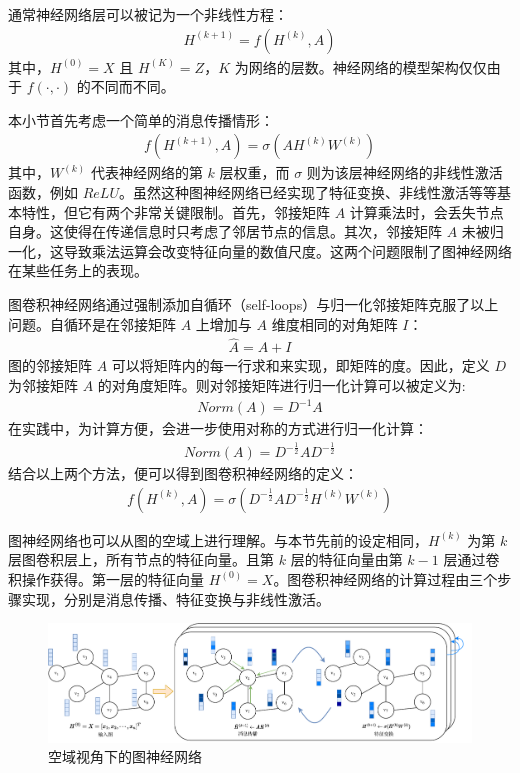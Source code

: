 通常神经网络层可以被记为一个非线性方程：
\begin{gather}
    H^{(k+1)} = f(H^{(k)}, A)
\end{gather}
其中，$H^{(0)} = X$ 且 $H^{(K)} = Z$，$K$ 为网络的层数。神经网络的模型架构仅仅由于 $f(\cdot, \cdot)$ 的不同而不同。

本小节首先考虑一个简单的消息传播情形：
\begin{gather}
    f(H^{(k+1)}, A) = \sigma (AH^{(k)}W^{(k)})
\end{gather}
其中，$W^{(k)}$ 代表神经网络的第 $k$ 层权重，而 $\sigma$ 则为该层神经网络的非线性激活函数，例如 $ReLU$。虽然这种图神经网络已经实现了特征变换、非线性激活等等基本特性，但它有两个非常关键限制。首先，邻接矩阵 $A$ 计算乘法时，会丢失节点自身\cite{kipf_gcn_2017}。这使得在传递信息时只考虑了邻居节点的信息。其次，邻接矩阵 $A$ 未被归一化，这导致乘法运算会改变特征向量的数值尺度。这两个问题限制了图神经网络在某些任务上的表现。

图卷积神经网络通过强制添加自循环（self-loops）与归一化邻接矩阵克服了以上问题。自循环是在邻接矩阵 $A$ 上增加与 $A$ 维度相同的对角矩阵 $I$：
\begin{gather}
    \hat{A} = A + I
\end{gather}
图的邻接矩阵 $A$ 可以将矩阵内的每一行求和来实现，即矩阵的度。因此，定义 $D$ 为邻接矩阵 $A$ 的对角度矩阵。则对邻接矩阵进行归一化计算可以被定义为:
\begin{gather}
    Norm(A) = D^{-1}A
\end{gather}
在实践中，为计算方便，会进一步使用对称的方式进行归一化计算：
\begin{gather}
    Norm(A) = D^{-\frac{1}{2}}AD^{-\frac{1}{2}}
\end{gather}
结合以上两个方法，便可以得到图卷积神经网络的定义：
\begin{gather}
    f(H^{(k)}, A) = \sigma (D^{-\frac{1}{2}}AD^{-\frac{1}{2}}H^{(k)}W^{(k)})
\end{gather}

图神经网络也可以从图的空域上进行理解。与本节先前的设定相同，$H^{(k)}$ 为第 $k$ 层图卷积层上，所有节点的特征向量。且第 $k$ 层的特征向量由第 $k-1$ 层通过卷积操作获得。第一层的特征向量 $H^{(0)} = X$。图卷积神经网络的计算过程由三个步骤实现，分别是消息传播、特征变换与非线性激活。

\begin{figure}[!h]
    \centering
    \includegraphics[width=\linewidth]{figure/gcn.drawio.pdf}
    \caption{空域视角下的图神经网络}
    \label{tag:gcn}
\end{figure}

